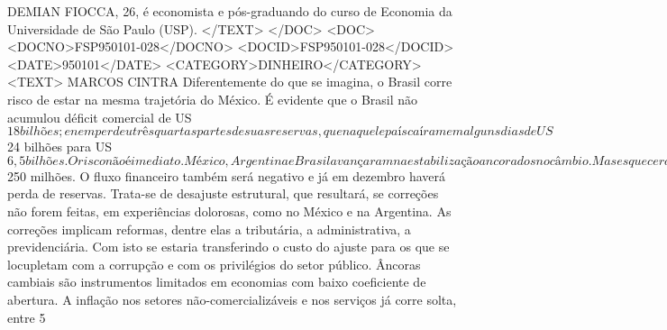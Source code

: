 DEMIAN FIOCCA, 26, é economista e pós-graduando do curso de Economia da Universidade de São Paulo (USP).
</TEXT>
</DOC>
<DOC>
<DOCNO>FSP950101-028</DOCNO>
<DOCID>FSP950101-028</DOCID>
<DATE>950101</DATE>
<CATEGORY>DINHEIRO</CATEGORY>
<TEXT>
MARCOS CINTRA 
Diferentemente do que se imagina, o Brasil corre risco de estar na mesma trajetória do México. É evidente que o Brasil não acumulou déficit comercial de US$ 18 bilhões; e nem perdeu três quartas partes de suas reservas, que naquele país caíram em alguns dias de US$ 24 bilhões para US$ 6,5 bilhões. O risco não é imediato.
México, Argentina e Brasil avançaram na estabilização ancorados no câmbio. Mas esqueceram dos fundamentos da estabilidade econômica, ao não complementarem a política cambial com mudanças no regime monetário e fiscal.
A fixação do câmbio é uma medida de curto prazo. Os preços internos caem. Os importados abundam. O PIB e o poder aquisitivo aumentam. Produtos sofisticados surgem nos mercados de consumo e de bens de capital.
Some-se a isto o fato do governo brasileiro ter controlado o componente inercial da inflação. Resultado: aumento de preços de 2%
Alguém paga por isto? Os lucros e salários dos setores de bens comercializáveis exportadores e setores que competem com os importados.
Os problemas, no entanto, começam a aparecer. Pelo segundo mês consecutivo haverá déficit comercial de cerca de US$ 250 milhões. O fluxo financeiro também será negativo e já em dezembro haverá perda de reservas.
Trata-se de desajuste estrutural, que resultará, se correções não forem feitas, em experiências dolorosas, como no México e na Argentina.
As correções implicam reformas, dentre elas a tributária, a administrativa, a previdenciária. Com isto se estaria transferindo o custo do ajuste para os que se locupletam com a corrupção e com os privilégios do setor público.
Âncoras cambiais são instrumentos limitados em economias com baixo coeficiente de abertura. A inflação nos setores não-comercializáveis e nos serviços já corre solta, entre 5%

